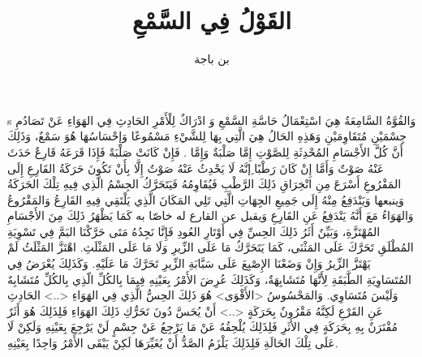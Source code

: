 \documentclass{article}
\title{القَوْلُ فِي السَّمْعِ}
\author{بن باجة}
\begin{document}
\maketitle
\leavevmode\hbox{s}
\beginnumbering
\pstart
وَالقُوَّةُ السَّامِعَةُ هِيَ اسْتِعْمَالُ حَاسَّةِ السَّمْعِ وَ ادْرَاكٌ لِلْأَمْرِ الحَادِثِ فِي الهَوَاءِ عَنْ تَصَادُمِ جِسْمَيْنِ مُتَقَاوِمَيْنِ وَهَذِهِ الحَالُ هِيَ الَّتِي  بِهَا لِلشَّيْءِ مَسْمُوعًا وَإِحْسَاسُهَا هُوَ سَمْعٌ، وَذَلِكَ أَنَّ كُلَّ الأَجْسَامِ المُحْدِثَةِ لِلصَّوْتِ إِمَّا صَلْبَةٌ وَإِمَّا . فَإِنْ كَانَتْ صَلْبَةً فَإِذَا قَرَعَهُ قَارِعٌ حَدَثَ عَنْهُ صَوْتٌ وَأَمَّا إِنْ كَانَ رَطْبًا ِإنَّهُ لَا يَحْدِثُ عَنْهُ صَوْتٌ إِلَّا بِأَنْ تَكُونَ حَرَكَةُ القَارِعِ إِلَى المَقْرُوعِ أَسْرَعَ مِنِ انْخِرَاقِ ذَلِكَ الرَّطْبِ فَيُقَاوِمُهُ فَيَتَحَرَّكُ الجِسْمُ الَّذِي فِيهِ تِلْكَ الحَرَكَةُ وَينبعها وَيَنْدَفِعُ مِنْهُ إِلَى جَمِيعِ الجِهَاتِ الَّتِي تَلِي المَكَانَ الَّذِي يَلْتَقِي فِيهِ القَارِعُ وَالمَقْرُوعُ وَالهَوَاءُ مَعَ أَنَّهُ يَنْدَفِعُ عَنِ القَارِعِ وَيقبل عن القارع له خاصّا به كَمَا يَظْهَرُ ذَلِكَ مِنَ الأَجْسَامِ المُهْتَزَّةِ، وَبَيِّنٌ أَثَرُ ذَلِكَ الحِسِّ فِي أَوْتَارِ العُودِ فَإِنَّا نَجِدُهُ مَتَى حَرَّكْنَا البَمَّ فِي تَسْوِيَةِ المُطْلَقِ تَحَرَّكَ عَلَى المَثْنَى، كَمَا يَتَحَرَّكُ مَا عَلَى الزِّيرِ وَلَا مَا عَلَى المَثْلَثِ.  اهْتَزَّ المَثْلَثُ لَمْ يَهْتَزَّ الزِّيرُ وَإِنْ وَضَعْنَا الإِصْبِعَ عَلَى سَبَّابَةِ الزِّيرِ تَحَرَّكَ مَا عَلَيْهِ. وَكَذَلِكَ يُعْرَضُ فِي المُتَسَاوِيَةِ الطَّبَقَةِ لِأَنَّهَا مُتَشَابِهَةٌ، وَكَذَلِكَ عُرِضَ الأَمْرُ بِعَيْنِهِ فِيمَا بِالكُلِّ الّذِي بِالكُلِّ مُتَشَابِهٌ وَلَيْسَ مُتَسَاوِي. وَالمَحْسُوسُ <الأَقْوَى> هُوَ ذَلِكَ الحِسُّ الَّذِي فِي الهَوَاءِ <..> الحَادِثِ عَنِ القَرْعِ لَكِنَّهُ مَقْرُونٌ بِحَرَكَةٍ <..> أَنْ يُحَسَّ دُونَ تَحَرُّكِ ذَلِكَ الهَوَاءِ فَلِذَلِكَ هُوَ أَثَرٌ مُقْتَرَنٌ بِهِ بِحَرَكَةٍ فِي الأَثَرِ فَلِذَلِكَ يُلْحِقُهُ عَنْ مَا يَرْجِعُ عَنْ جِسْمٍ لَنْ يَرْجِعَ بِعَيْنِهِ وَلَكِنْ لَا عَلَى تِلْكَ الحَالَةِ فَلِذَلِكَ يَلْزَمُ الصَّدُّ أَنْ يُغَيِّرَهَا لَكِنْ يَبْقَى الأَمْرُ وَاحِدًا بِعَيْنِهِ.
\end{document}

